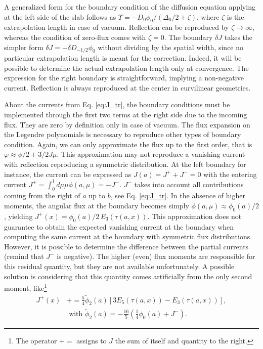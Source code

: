 \documentclass{ictt26}
\newcommand{\pluseq}{\mathrel{+}=}
\begin{document}
A generalized form for the boundary condition of the diffusion equation applying at the left side of the slab follows as $\Upsilon = - D_0 \phi_0 / (\Delta_0 / 2 + \zeta)$, where $\zeta$ is the extrapolation length in case of vacuum. Reflection can be reproduced by $\zeta \rightarrow \infty$, whereas the condition of zero-flux comes with $\zeta = 0$. The boundary $\delta J$ takes the simpler form $\delta J = - \delta D_{-1/2} \phi_0$ without dividing by the spatial width, since no particular extrapolation length is meant for the correction. Indeed, it will be possible to determine the actual extrapolation length only at convergence. The expression for the right boundary is straightforward, implying a non-negative current. Reflection is always reproduced at the center in curvilinear geometries.

About the currents from Eq. \ref{eq:J_tr}, the boundary conditions must be implemented through the first two terms at the right side due to the incoming flux. They are zero by definition only in case of vacuum. The flux expansion on the Legendre polynomials is necessary to reproduce other types of boundary condition. Again, we can only approximate the flux up to the first order, that is $\varphi \approx \phi/2 + 3/2 J \mu$. This approximation may not reproduce a vanishing current with reflection reproducing a symmetric distribution. At the left boundary for instance, the current can be expressed as $J(a) =  J^+ + J^- = 0$ with the entering current $J^+ = \int_0^1 { d\mu \mu \phi(a, \mu) } = - J^-$. $J^-$ takes into account all contributions coming from the right of $a$ up to $b$, see Eq. \ref{eq:J_tr}. In the absence of higher moments, the angular flux at the boundary becomes simply $\phi(a, \mu) \approx \phi_0(a) / 2$, yielding $J^+(x) = \phi_0(a)/2\, E_3 \left(\tau(a, x)\right)$. This approximation does not guarantee to obtain the expected vanishing current at the boundary when computing the same current at the boundary with symmetric flux distributions. However, it is possible to determine the difference between the partial currents (remind that $J^-$ is negative). The higher (even) flux moments are responsible for this residual quantity, but they are not available unfortunately. A possible solution is considering that this quantity comes artificially from the only second moment, like\footnote{The operator $\pluseq$ assigns to $J$ the sum of itself and quantity to the right.}
\begin{equation}
\begin{split}
J^+(x) &\pluseq \frac{5}{4} \tilde{\phi}_2(a) \left[ 3 E_5(\tau(a, x)) - E_3(\tau(a, x)) \right],\\ &\text{ with } \tilde{\phi}_2(a) = - \frac{16}{5} \left( \frac{1}{4} \phi_0(a) + J^- \right).
\end{split}
\end{equation}
\end{document}

